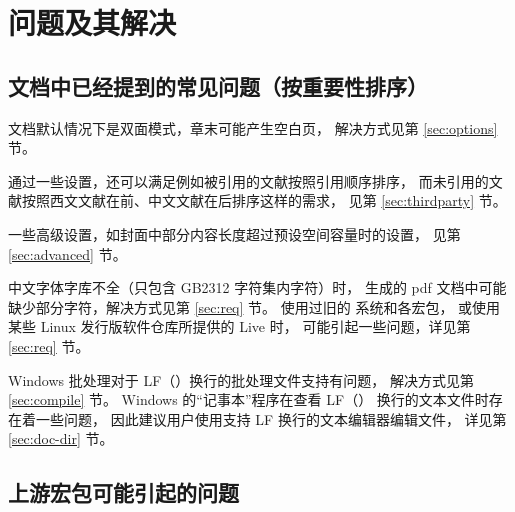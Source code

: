 %
%
%
%

\chapter{问题及其解决}
\section{文档中已经提到的常见问题（按重要性排序）}

文档默认情况下是双面模式，章末可能产生空白页，
解决方式见第 \ref{sec:options} 节。

通过一些设置，还可以满足例如被引用的文献按照引用顺序排序，
而未引用的文献按照西文文献在前、中文文献在后排序这样的需求，
见第 \ref{sec:thirdparty} 节。

一些高级设置，如封面中部分内容长度超过预设空间容量时的设置，
见第 \ref{sec:advanced} 节。

中文字体字库不全（只包含 GB2312 字符集内字符）时，
生成的 pdf 文档中可能缺少部分字符，解决方式见第 \ref{sec:req} 节。
使用过旧的  系统和各宏包，
或使用某些 Linux 发行版软件仓库所提供的  Live 时，
可能引起一些问题，详见第 \ref{sec:req} 节。

Windows 批处理对于 LF（\texttt{\string\n}）换行的批处理文件支持有问题，
解决方式见第 \ref{sec:compile} 节。
Windows 的“记事本”程序在查看 LF（\texttt{\string\n}）
换行的文本文件时存在着一些问题，
因此建议用户使用支持 LF 换行的文本编辑器编辑文件，
详见第 \ref{sec:doc-dir} 节。

\section{上游宏包可能引起的问题}

